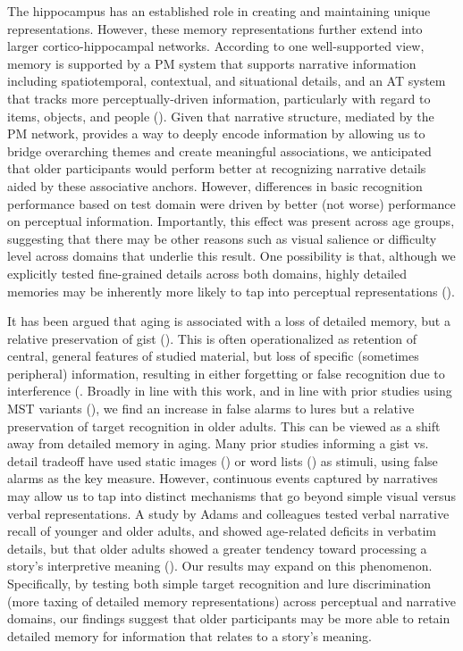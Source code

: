 \documentclass[11pt]{article}
\begin{document}
The hippocampus has an established role in creating and maintaining unique representations. However, these memory representations further extend into larger cortico-hippocampal networks. According to one well-supported view, memory is supported by a PM system that supports narrative information including spatiotemporal, contextual, and situational details, and an AT system that tracks more perceptually-driven information, particularly with regard to items, objects, and people (\cite{ranganath_two_2012, ritchey_cortico-hippocampal_2015}). Given that narrative structure, mediated by the PM network, provides a way to deeply encode information by allowing us to bridge overarching themes and create meaningful associations, we anticipated that older participants would perform better at recognizing narrative details aided by these associative anchors. However, differences in basic recognition performance based on test domain were driven by better (not worse) performance on perceptual information. Importantly, this effect was present across age groups, suggesting that there may be other reasons such as visual salience or difficulty level across domains that underlie this result. One possibility is that, although we explicitly tested fine-grained details across both domains, highly detailed memories may be inherently more likely to tap into perceptual representations (\cite{robin_details_2017}).

It has been argued that aging is associated with a loss of detailed memory, but a relative preservation of gist (\cite{schacter_false_1997}). This is often operationalized as retention of central, general features of studied material, but loss of specific (sometimes peripheral) information, resulting in either forgetting or false recognition due to interference (\cite{koutstaal_gist-based_1997, norman_false_1997, tun_response_nodate}. Broadly in line with this work, and in line with prior studies using MST variants (\cite{stark_task_2013, stark_stability_2015, stark_mnemonic_2019}), we find an increase in false alarms to lures but a relative preservation of target recognition in older adults. This can be viewed as a shift away from detailed memory in aging. Many prior studies informing a gist vs. detail tradeoff have used static images (\cite{stark_stability_2015}) or word lists (\cite{norman_false_1997}) as stimuli, using false alarms as the key measure. However, continuous events captured by narratives may allow us to tap into distinct mechanisms that go beyond simple visual versus verbal representations. A study by Adams and colleagues tested verbal narrative recall of younger and older adults, and showed age-related deficits in verbatim details, but that older adults showed a greater tendency toward processing a story’s interpretive meaning (\cite{adams_adult_1997}). Our results may expand on this phenomenon. Specifically, by testing both simple target recognition and lure discrimination (more taxing of detailed memory representations) across perceptual and narrative domains, our findings suggest that older participants may be more able to retain detailed memory for information that relates to a story’s meaning.
\end{document}
